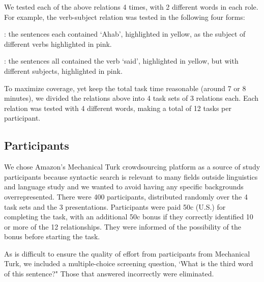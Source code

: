 We tested each of the above relations 4 times, with 2 different words in each role. For example, the verb-subject relation  was tested in the following four forms:
\squishlist
	\item {}:  the sentences each contained `Ahab', highlighted in yellow, as the subject of different verbs highlighted in pink.
	\item {}

	\item {}: the sentences all contained the verb `said', highlighted in yellow, but with different subjects, highlighted in pink.
	\item {}
\squishend

To maximize coverage, yet keep the total task time reasonable (around 7 or 8 minutes), we divided the relations above into 4 task sets of 3 relations each. Each relation was tested with 4 different words, making a total of 12 tasks per participant.

\subsection{Participants}
We chose Amazon's Mechanical Turk crowdsourcing platform as a source of study participants because syntactic search is relevant to many fields outside linguistics and language study and we wanted to avoid having any specific backgrounds overrepresented. There were 400 participants, distributed randomly over the 4 task sets and the 3 presentations. Participants were paid 50c (U.S.) for completing the task, with an additional 50c bonus if they correctly identified 10 or more of the 12 relationships. They were informed of the possibility of the bonus before starting the task.

As is difficult to ensure the quality of effort from participants from Mechanical Turk, we included a multiple-choice screening question, `What is the third word of this sentence?"  Those that answered incorrectly were eliminated.


